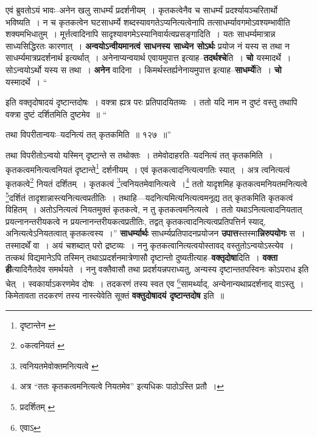\documentclass[article,12pt,a4paper]{memoir}
\begin{document}
	  \pstart एवं ब्रुवतोऽयं भावः--अनेन खलु साधर्म्यं प्रदर्शनीयम् । कृतकत्वेनैव च साधर्म्यं प्रदर्श्यायञ्चरितार्थो भविष्यति । न च कृतकत्वेन घटसाधर्म्ये शब्दस्यावगतेऽप्यनित्यत्वेनापि तत्साधर्म्यावगमोऽवश्यम्भावीति शक्यमभिधातुम् । मूर्त्तत्वादिनापि सादृश्यावगमेऽस्यानिवार्यत्वप्रसङ्गादिति । यतः साधर्म्यमात्रान्न साध्यसिद्धिरतः कारणात् । \textbf{अन्वयोऽन्वीयमानत्वं साधनस्य साध्येन सोऽर्थः} प्रयोज \leavevmode{} नं यस्य स तथा न साधर्म्यमात्रप्रदर्शनार्थ इत्यर्थात् । अनेनाप्यन्वयार्थ एवायमुपात्त इत्याह--\textbf{तदर्थश्चे}ति । \textbf{चो} यस्मादर्थे । सोऽन्वयोऽर्थो यस्य स तथा । \textbf{अनेन} वादिना । किमर्थस्तर्ह्यनेनायमुपात्त इत्याह--\textbf{साधर्म्ये}ति । \textbf{चो} यस्मादर्थे ।  \leavevmode{} “
	  
	इति वक्तृदोषादयं दृष्टान्तदोषः । वक्त्रा ह्यत्र परः प्रतिपादयितव्यः । ततो यदि नाम न दुष्टं वस्तु तथापि वक्त्रा दुष्टं दर्शितमिति दुष्टमेव ॥ “
	  
	तथा विपरीतान्वयः--यदनित्यं तत् कृतकमिति ॥ १२७ ॥” 
	  
	तथा विपरीतोऽन्वयो यस्मिन् दृष्टान्ते स तथोक्तः । तमेवोदाहरति--यदनित्यं तत् कृतकमिति । कृतकत्वमनित्यत्वनियतं दृष्टान्ते\footnote{दृष्टान्तेन \cite{dp-edE}} दर्शनीयम् । एवं कृतकत्वादनित्यत्वगतिः स्यात् । अत्र त्वनित्यत्वं कृतकत्वे\footnote{०कत्वनियतं \cite{dp-msD}} नियतं दर्शितम् । कृतकत्वं \footnote{त्वनियतमेवोक्तमनित्यत्वे \cite{dp-msC} \cite{dp-msD}}\-त्वनियतमेवानित्यत्वे ।\footnote{अत्र “ततः कृतकत्वमनित्यत्वे नियतमेव” इत्यधिकः पाठोऽस्ति \cite{dp-edE} प्रतौ ।} ततो यादृशमिह कृतकत्वमनियतमनित्यत्वे \footnote{प्रदर्शितम् \cite{dp-msA} \cite{dp-msB} \cite{dp-edP} \cite{dp-edH} \cite{dp-edE} \cite{dp-edN}}\-दर्शितं तादृशान्नास्त्यनित्यत्वप्रतीतिः । तथाहि—यदनित्यमित्यनित्यत्वमनूद्य तत् कृतकमिति कृतकत्वं विहितम् । अतोऽनित्यत्वं नियतमुक्तं कृतकत्वे, न तु कृतकत्वमनित्यत्वे । ततो यथाऽनित्यत्वादनियतात् प्रयत्नानन्तरीयकत्वे न प्रयत्नानन्तरीयकत्वप्रतीतिः, तद्वत् कृतकत्वादनित्यत्वप्रतिपत्तिर्न स्याद्, अनित्यत्वेऽनियतत्वात् कृतकत्वस्य ।” \textbf{साधर्म्यार्थः} साधर्म्यप्रतिपादनप्रयोजन \textbf{उपात्त}स्तस्मा\textbf{न्निरुपयोगः} स । तस्मादर्थें वा । अयं चशब्दात् परो द्रष्टव्यः । ननु कृतकत्वानित्यत्वयोस्तावद् वस्तुतोऽन्वयोऽस्त्येव । तत्कथं विद्यमानेऽपि तस्मिन् तथाऽप्रदर्शनमात्रेणासौ दृष्टान्तो दुष्यतीत्याह--\textbf{वक्तृदोषा}दिति । \textbf{वक्ता ही}त्यादिनैतदेव समर्थयते । ननु वक्तैवासौ तथा प्रदर्शयन्नपराध्यतु, अन्यस्य दृष्टान्ततपस्विनः कोऽपराध इति चेत् । स्वकार्याऽकरणमेव दोषः । तदकरणं तस्य स्वत एव \footnote{एवाऽ}सामर्थ्याद्, अन्येनान्यथाप्रदर्शनाद् वाऽस्तु । किमेतावता तदकरणं तस्य नास्त्येवेति सूक्तं \textbf{वक्तुदोषादयं दृष्टान्तदोष} इति ॥
	\pend
      
\end{document}
